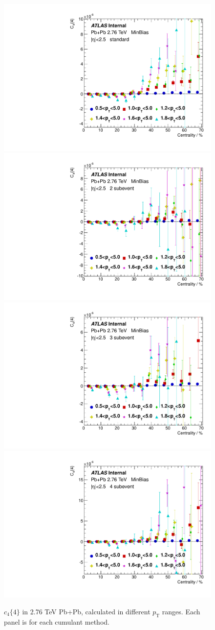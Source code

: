 \begin{figure}[H]
\centering
\includegraphics[width=.245\linewidth]{figs/sec_appendix/PbPb276/PbPb276_pT_1sub_Har4.pdf}
\includegraphics[width=.245\linewidth]{figs/sec_appendix/PbPb276/PbPb276_pT_2sub_Har4.pdf}
\includegraphics[width=.245\linewidth]{figs/sec_appendix/PbPb276/PbPb276_pT_3sub_Har4.pdf}
\includegraphics[width=.245\linewidth]{figs/sec_appendix/PbPb276/PbPb276_pT_4sub_Har4.pdf}
\caption{$c_4\{4\}$ in 2.76 TeV Pb+Pb, calculated in different $p_\text{T}$ ranges. Each panel is for each cumulant method.}
\label{fig:PbPb276_pT_v4}
\end{figure}

